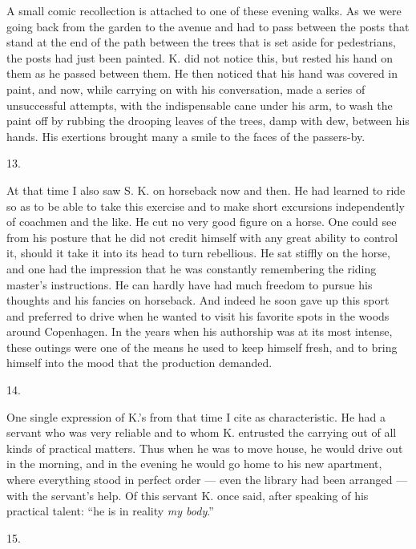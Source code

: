 \documentclass[12pt,a4paper,openany]{book}
\newcommand{\secnum}[1]{\par\begin{center}#1\end{center}\par\nobreak}
\newcommand{\opage}[1]{\marginnote{\footnotesize\textit{[#1]}}}
\begin{document}
A small comic recollection is attached to one of these evening walks. As
we were going back from the garden to the avenue and had to pass between
the posts that stand at the end of the path between the trees that is set
aside for pedestrians, the posts had just been painted. K. did not notice
this, but rested his hand on them as he passed between them. He then
noticed that his hand was covered in paint, and now, while carrying on
with his conversation, made a series of unsuccessful attempts, with the
indispensable cane under his arm, to wash the paint off by rubbing the
drooping leaves of the trees, damp with dew, between his hands. His
exertions brought many a smile to the faces of the passers-by.

\secnum{13.}

At that time I also saw S. K. on horseback now and then. He had learned
to ride so as to be able to take this exercise and to make short
excursions independently of coachmen and the like. He cut no very good
figure on a horse. One could see from his posture that he did not credit
himself with any great ability to control it, should it take it into its
head to turn rebellious. He sat stiffly on the horse, and one had the
impression that he was constantly remembering the riding master's
instructions. He can hardly have had much freedom to pursue his thoughts
and his fancies on horseback. And indeed he soon gave up this sport and
preferred to drive when he wanted to visit his favorite spots in the woods
around Copenhagen. In the years when his authorship was at its most
intense, these outings were one of the means he used to keep
\opage{348}himself fresh, and to bring himself into the mood that the
production demanded.

\secnum{14.}

One single expression of K.'s from that time I cite as characteristic. He
had a servant who was very reliable and to whom K. entrusted the carrying
out of all kinds of practical matters. Thus when he was to move house, he
would drive out in the morning, and in the evening he would go home to his
new apartment, where everything stood in perfect order --- even the
library had been arranged --- with the servant's help. Of this servant K.
once said, after speaking of his practical talent: ``he is in reality
\emph{my body}.''

\secnum{15.}
\end{document}
